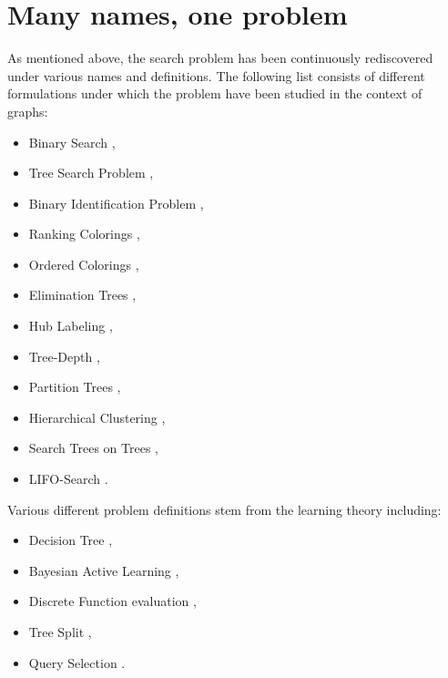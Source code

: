 \section{Many names, one problem}

As mentioned above, the search problem has been continuously rediscovered under various names and definitions. 
The following list consists of different formulations under which the problem have been studied in the context of graphs: 
\begin{itemize}
    \item Binary Search \cite{OnakParys2006GenOfBSSInTsAndFLikePosets, dereniowski2017ApproxSsForGeneralBSinWTs, Deligkas2019BsInGsRev, Emamjomeh2016DetAndProbBSinGs, dereniowski2022CFApproxAlgForBSInTsWithMonoQTimes, dereniowski2024SInTsMonoQTs, noisyBSSFC, Dereniowski2024OnMG, EfficientNoisyBinarySearch, Dereniowski2023Edge},
    \item Tree Search Problem \cite{Jacobs2010OnTheComplexSearchInTsAvg, Cicalese2014ImprovedApproxAvgTs, Cicalese2016OnTSPwNonUniCost}, 
    \item Binary Identification Problem \cite{Cicalese2012BinIdentPForWTs, Karbasi2013Constrained}, 
    \item Ranking Colorings \cite{Knuth1973, Dereniowski2009ERankOfWTs, DereniowskiERAndSInPOSets, DereniowskiEfPQProcByGRank, DereniowskiVxRankOfChGsAndWTs, Lam1998ERankOfGsIsH}, 
    \item Ordered Colorings \cite{KATCHALSKI1995141}, 
    \item Elimination Trees \cite{Pothen1988OptimalEliminationTrees}, 
    \item Hub Labeling \cite{Angelidakis2018ShortestPQ},
    \item Tree-Depth \cite{NESETRIL20061022, BOROWIECKI2023113682},
    \item Partition Trees \cite{OnDasHC, Hgemo2024TightAB},
    \item Hierarchical Clustering \cite{Approximatehierarchicalclusteringviasparsestcutandspreadingmetrics}, 
    \item Search Trees on Trees \cite{SplayTonT, Fast_app_centroid_trees}, 
    \item LIFO-Search \cite{GIANNOPOULOU20122089}. 
\end{itemize}
Various different problem definitions stem from the learning theory including:
\begin{itemize}
    \item Decision Tree \cite{LABER2004209,ATightAnalysisofGreedy, GuptasApproxAlgsForOptDTsAndAdaptTSPPs, Tradingoff},
    \item Bayesian Active Learning \cite{NearoptimalBayesianactivelearning,Analysisofgreedyactivelearningstrategy},
    \item Discrete Function evaluation \cite{Diagnosisdetermination},
    \item Tree Split \cite{OnanOptimalSplitTreeProblem},
    \item Query Selection \cite{QuerySelection}.
\end{itemize}

